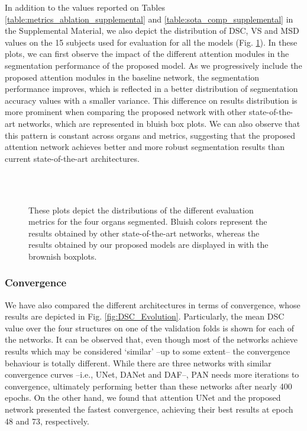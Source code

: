\documentclass[journal]{IEEEtran}
\begin{document}
In addition to the values reported on Tables \ref{table:metrics_ablation_supplemental} and \ref{table:sota_comp_supplemental} in the Supplemental Material, we also depict the distribution of DSC, VS and MSD values on the 15 subjects used for evaluation for all the models (Fig. \ref{fig:metrics}). In these plots, we can first observe the impact of the different attention modules in the segmentation performance of the proposed model. As we progressively include the proposed attention modules in the baseline network, the segmentation performance improves, which is reflected in a better distribution of segmentation accuracy values with a smaller variance. This difference on results distribution is more prominent when comparing the proposed network with other state-of-the-art networks, which are represented in bluish box plots. We can also observe that this pattern is constant across organs and metrics, suggesting that the proposed attention network achieves better and more robust segmentation results than current state-of-the-art architectures.


\begin{figure}[h!]
 \\
\\
    \caption{These plots depict the distributions of the different evaluation metrics for the four organs segmented. Bluish colors represent the results obtained by other state-of-the-art networks, whereas the results obtained by our proposed models are displayed in with the brownish boxplots.}
    \label{fig:metrics}
\end{figure}


\subsubsection{\textbf{Convergence}}

We have also compared the different architectures in terms of convergence, whose results are depicted in Fig. \ref{fig:DSC_Evolution}. Particularly, the mean DSC value over the four structures on one of the validation folds is shown for each of the networks. It can be observed that, even though most of the networks achieve results which may be considered `similar' --up to some extent-- the convergence behaviour is totally different. While there are three networks with similar convergence curves --i.e., UNet, DANet and DAF--, PAN needs more iterations to convergence, ultimately performing better than these networks after nearly 400 epochs. On the other hand, we found that attention UNet and the proposed network presented the fastest convergence, achieving their best results at epoch 48 and 73, respectively.
\end{document}
